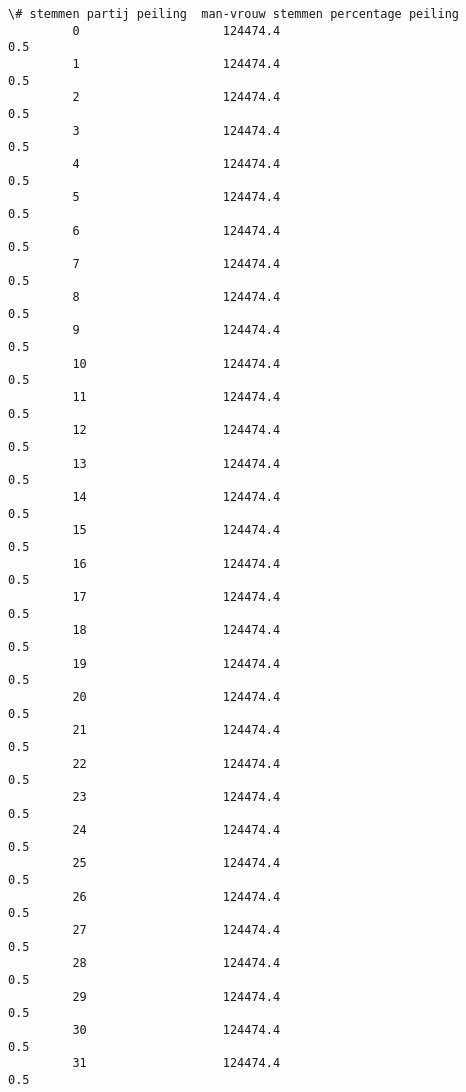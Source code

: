 \documentclass{article}
\begin{document}
\begin{Verbatim}[commandchars=\\\{\}]
              \# stemmen partij peiling  man-vrouw stemmen percentage peiling  
         0                    124474.4                                   0.5  
         1                    124474.4                                   0.5  
         2                    124474.4                                   0.5  
         3                    124474.4                                   0.5  
         4                    124474.4                                   0.5  
         5                    124474.4                                   0.5  
         6                    124474.4                                   0.5  
         7                    124474.4                                   0.5  
         8                    124474.4                                   0.5  
         9                    124474.4                                   0.5  
         10                   124474.4                                   0.5  
         11                   124474.4                                   0.5  
         12                   124474.4                                   0.5  
         13                   124474.4                                   0.5  
         14                   124474.4                                   0.5  
         15                   124474.4                                   0.5  
         16                   124474.4                                   0.5  
         17                   124474.4                                   0.5  
         18                   124474.4                                   0.5  
         19                   124474.4                                   0.5  
         20                   124474.4                                   0.5  
         21                   124474.4                                   0.5  
         22                   124474.4                                   0.5  
         23                   124474.4                                   0.5  
         24                   124474.4                                   0.5  
         25                   124474.4                                   0.5  
         26                   124474.4                                   0.5  
         27                   124474.4                                   0.5  
         28                   124474.4                                   0.5  
         29                   124474.4                                   0.5  
         30                   124474.4                                   0.5  
         31                   124474.4                                   0.5  

\end{Verbatim}
\end{document}
